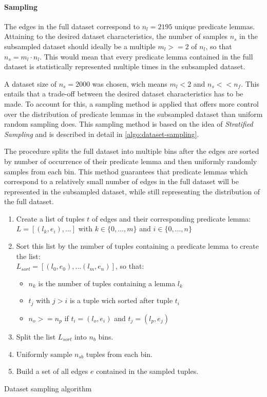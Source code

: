 \documentclass[11pt]{scrreprt}
\let\cite\parencite  %
\begin{document}
\paragraph{Sampling} 
The edges in the full dataset correspond to \(n_{l} = 2195\) unique predicate lemmas. Attaining to the desired dataset characteristics, the number of samples \(n_{s}\) in the subsampled dataset should ideally be a multiple \(m_{l} >= 2\) of \(n_{l}\), so that \(n_{s} = m_{l} \cdot  n_{l}\). This would mean that every predicate lemma contained in the full dataset is statistically represented multiple times in the subsampled dataset.

A dataset size of \(n_{s}=2000\) was chosen, wich means \(m_{l} < 2\) and  \(n_s << n_f\). This entails that a trade-off between the desired dataset characteristics has to be made. To account for this, a sampling method is applied that offers more control over the distribution of predicate lemmas in the subsampled dataset than uniform random sampling does. This sampling method is based on the idea of \textit{Stratified Sampling} \cite{parsonsStratifiedSampling2017}  and is described in detail in \cref{algo:dataset-sampling}. 

The procedure splits the full dataset into multiple bins after the edges are sorted by number of occurrence of their predicate lemma and then uniformly randomly samples from each bin. This method guarantees that predicate lemmas which correspond to a relatively small number of edges in the full dataset will be represented in the subsampled dataset, while still representing the distribution of the full dataset. 


\begin{algorithm}
\begin{enumerate}
	\item Create a list of tuples \(t\) of edges and their corresponding predicate lemma: \\ \(L = [(l_k, e_i), ...]\) with \(k \in \{0,...,m\}\) and \(i \in \{0,...,n\}\)
	\item Sort this list by the number of tuples containing a predicate lemma to create the list: \\ \(L_{sort} = [(l_0, e_0), ... (l_m, e_n)]\), so that:
	\begin{itemize}
		\item \(n_k\) is the number of tuples containing a lemma \(l_k\)
		\item \(t_j\) with \(j > i\) is a tuple wich sorted after tuple \(t_i\)
		\item \(n_o >= n_p\) if \(t_i = (l_o, e_i)\) and \(t_j = (l_p, e_j)\)
	\end{itemize}			
	\item Split the list \(L_{sort}\) into \(n_{b}\) bins.
	\item Uniformly sample \(n_{sb}\) tuples from each bin.
	\item Build a set of all edges \(e\) contained in the sampled tuples.
\end{enumerate}
\caption{Dataset sampling algorithm}
\label{algo:dataset-sampling}
\end{algorithm}
\end{document}
